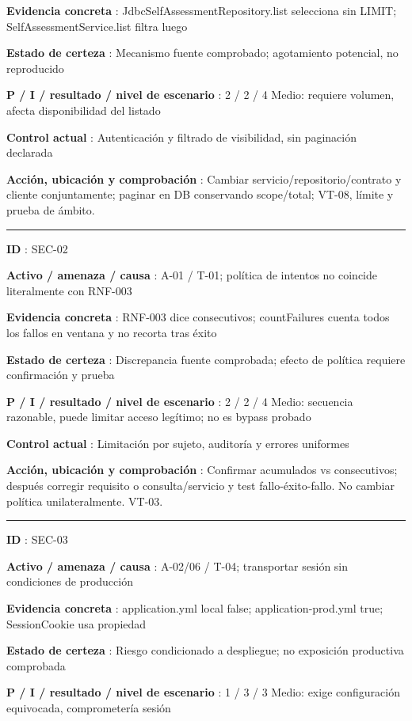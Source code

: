 \documentclass[12pt,a4paper]{report}
\begin{document}
\textbf{Evidencia concreta }: JdbcSelfAssessmentRepository.list
selecciona sin LIMIT; SelfAssessmentService.list filtra luego

\textbf{Estado de certeza }: Mecanismo fuente comprobado; agotamiento
potencial, no reproducido

\textbf{P / I / resultado / nivel de escenario }: 2 / 2 / 4 Medio:
requiere volumen, afecta disponibilidad del listado

\textbf{Control actual }: Autenticación y filtrado de visibilidad, sin
paginación declarada

\textbf{Acción, ubicación y comprobación }: Cambiar
servicio/repositorio/contrato y cliente conjuntamente; paginar en DB
conservando scope/total; VT-08, límite y prueba de ámbito.

\medskip\hrule\medskip

\textbf{ID }: SEC-02

\textbf{Activo / amenaza / causa }: A-01 / T-01; política de intentos no
coincide literalmente con RNF-003

\textbf{Evidencia concreta }: RNF-003 dice consecutivos; countFailures
cuenta todos los fallos en ventana y no recorta tras éxito

\textbf{Estado de certeza }: Discrepancia fuente comprobada; efecto de
política requiere confirmación y prueba

\textbf{P / I / resultado / nivel de escenario }: 2 / 2 / 4 Medio:
secuencia razonable, puede limitar acceso legítimo; no es bypass probado

\textbf{Control actual }: Limitación por sujeto, auditoría y errores
uniformes

\textbf{Acción, ubicación y comprobación }: Confirmar acumulados vs
consecutivos; después corregir requisito o consulta/servicio y test
fallo-éxito-fallo. No cambiar política unilateralmente. VT-03.

\medskip\hrule\medskip

\textbf{ID }: SEC-03

\textbf{Activo / amenaza / causa }: A-02/06 / T-04; transportar sesión
sin condiciones de producción

\textbf{Evidencia concreta }: application.yml local false;
application-prod.yml true; SessionCookie usa propiedad

\textbf{Estado de certeza }: Riesgo condicionado a despliegue; no
exposición productiva comprobada

\textbf{P / I / resultado / nivel de escenario }: 1 / 3 / 3 Medio: exige
configuración equivocada, comprometería sesión
\end{document}
